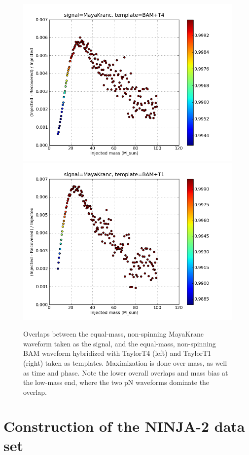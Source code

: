 \begin{figure}
  \includegraphics[width=0.5\linewidth]{figures/ninja2/maya_bamt4_max_over_m}
  \includegraphics[width=0.5\linewidth]{figures/ninja2/maya_bamt1_max_over_m}
  \caption[Overlaps between NINJA-2 submissions maximized over mass]{
  \label{f:ninja2_max_over_mass_bam}
Overlaps between the equal-mass, non-spinning MayaKranc waveform taken
as the signal, and the equal-mass, non-spinning BAM waveform
hybridized with TaylorT4 (left) and TaylorT1 (right) taken as
templates.  Maximization is done over mass, as well as time and phase.
Note the lower overall overlaps and mass bias at the low-mass end,
where the two pN waveforms dominate the overlap.}
\end{figure}%


\section{Construction of the NINJA-2 data set}

